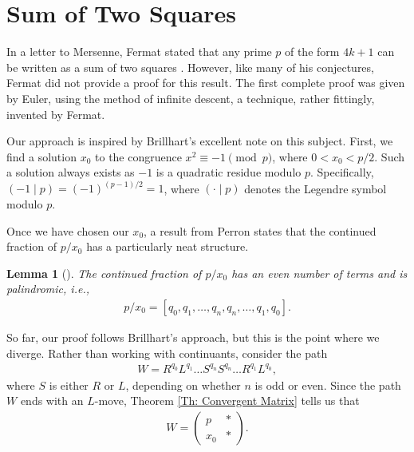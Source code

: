 \documentclass[12pt]{article}
\theoremstyle{plain}
\newtheorem{lemma}[theorem]{Lemma}
\theoremstyle{definition}
\theoremstyle{remark}
\begin{document}
\section{Sum of Two Squares} \label{Ch: Sum of Two Squares}

In a letter to Mersenne, Fermat stated that any prime $ p $ of the form $ 4k + 1 $ can be written as a sum of two squares \cite{Dickson}. However, like many of his conjectures, Fermat did not provide a proof for this result. The first complete proof was given by Euler, using the method of infinite descent, a technique, rather fittingly, invented by Fermat. 

Our approach is inspired by Brillhart's excellent note  \cite{Brillhart} on this subject. First, we find a solution $ x_0 $ to the congruence $ x^2 \equiv -1 \pmod{p} $, where $ 0 < x_0 < p/2 $. Such a solution always exists as $ -1 $ is a quadratic residue modulo $ p $. Specifically, $ (-1 \mid p) = (-1)^{(p - 1)/2} = 1 $, where $ (\cdot \mid p) $ denotes the Legendre symbol modulo $ p $.

Once we have chosen our $ x_0 $, a result from Perron states that the continued fraction of $ p/x_0 $ has a particularly neat structure. 
\begin{lemma}[\cite{Perron}] \label{Th: Palindromic continued fraction}
The continued fraction of $ p/x_0 $ has an even number of terms and is palindromic, i.e., 
\begin{align*}
	p/x_0 = [q_0, q_1, \ldots, q_n, q_n, \ldots, q_1, q_0].
\end{align*}
\end{lemma}

So far, our proof follows Brillhart's approach, but this is the point where we diverge. Rather than working with continuants, consider the path
\begin{align*}
	W = R^{q_0} L^{q_1} \ldots S^{q_n} S^{q_n} \ldots R^{q_1} L^{q_0},
\end{align*} 
where $ S $ is either $ R $ or $ L $, depending on whether $ n $ is odd or even. Since the path $ W $ ends with an $ L $-move, Theorem \ref{Th: Convergent Matrix} tells us that 
\begin{align*}
	W = \begin{pmatrix} p & * \\ x_0 & * \end{pmatrix}.
\end{align*}
\end{document}
